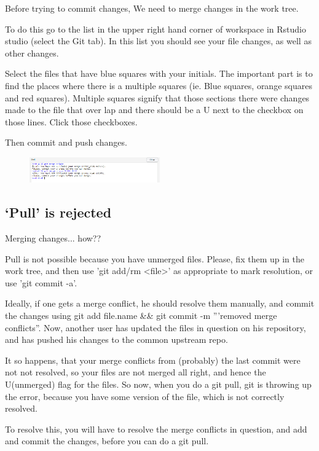 \documentclass[12pt]{../SOP4_alpha}\usepackage[]{graphicx}\usepackage[]{color}
\begin{document}
\NP Before trying to commit changes, We need to merge changes in the work tree. 

\NP To do this go to the list in the upper right hand corner of workspace in Rstudio studio (select the Git tab). In this list you should see your file changes, as well as other changes. 

\NP Select the files that have blue squares with your initials. The important part is to find the places where there is a multiple squares (ie. Blue squares, orange squares and red squares). Multiple squares signify that those sections there were changes made to the file that over lap and there should be a U next to the checkbox on those lines. Click those checkboxes. 

\NP Then commit and push changes. 

\begin{figure}
\centering
\includegraphics[width=0.5\textwidth]{graphics/MergeError.jpg}
\end{figure}

\subsection{`Pull' is rejected}

\NP Merging changes... how??

Pull is not possible because you have unmerged files.
Please, fix them up in the work tree, and then use 'git add/rm <file>'
as appropriate to mark resolution, or use 'git commit -a'.

Ideally, if one gets a merge conflict, he should resolve them manually, and commit the changes using git add file.name \&\& git commit -m '''removed merge conflicts''. Now, another user has updated the files in question on his repository, and has pushed his changes to the common upstream repo.

It so happens, that your merge conflicts from (probably) the last commit were not not resolved, so your files are not merged all right, and hence the U(unmerged) flag for the files. So now, when you do a git pull, git is throwing up the error, because you have some version of the file, which is not correctly resolved.

To resolve this, you will have to resolve the merge conflicts in question, and add and commit the changes, before you can do a git pull.
\end{document}
